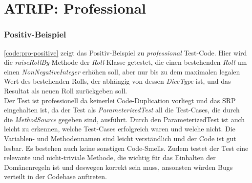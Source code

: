 

\section{ATRIP: Professional}

\subsubsection{Positiv-Beispiel}

\autoref{code:pro-positive} zeigt das Positiv-Beispiel zu \textit{professional} Test-Code. Hier wird die 
\textit{raiseRollBy}-Methode der \textit{Roll}-Klasse getestet, die einen bestehenden \textit{Roll} 
um einen \textit{NonNegativeInteger} erhöhen soll, aber nur bis zu dem maximalen legalen Wert des bestehenden Rolls, 
der abhängig von dessen \textit{DiceType} ist, und das Resultat als neuen Roll zurückgeben soll. \\
Der Test ist professionell da keinerlei Code-Duplication vorliegt und das SRP eingehalten ist, 
da der Test als \textit{ParameterizedTest} all die Test-Cases, die durch die \textit{MethodSource} gegeben sind, ausführt.
Durch den ParameterizedTest ist auch leicht zu erkennen, welche Test-Cases erfolgreich waren und welche nicht. 
Die Variablen- und Methodennamen sind leicht verständlich und der Code ist gut lesbar. 
Es bestehen auch keine sonstigen Code-Smells. Zudem testet der Test eine relevante und nicht-triviale Methode, 
die wichtig für das Einhalten der Domänenregeln ist und deswegen korrekt sein muss, ansonsten würden Bugs 
verteilt in der Codebase auftreten.  



